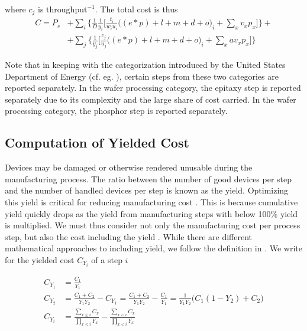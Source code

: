 \documentclass[10pt]{article}
\begin{document}
where $c_j$ is $\text{throughput}^{-1}$. The total cost is thus
\begin{equation}
\label{eqn:cost_total}
\begin{split}
    C= P_s &+ \sum_i \bigg \{ \frac{1}{D} \frac{1}{y_i} \bigg[ \frac{t_i}{w_i u_i} \bigg((e*p) + l + m + d +o \bigg)_i  + \sum_{x} v_x p_x \bigg] \bigg \} + \\
    & + \sum_j \bigg \{ \frac{1}{y_j} \bigg[ \frac{c_j}{u_j}  \bigg((e*p) + l + m + d + o \bigg)_i + \sum_{x} a v_x p_x \bigg ] \bigg\}
\end{split}
\end{equation}

Note that in keeping with the categorization introduced by the United States Department of Energy (cf. eg. \cite{doe_ssl_rnd_2019}), certain steps from these two categories are reported separately. In the wafer processing category, the epitaxy step is reported separately due to its complexity and the large share of cost carried. In the wafer processing category, the phosphor step is reported separately.

\subsection{Computation of Yielded Cost}

Devices may be damaged or otherwise rendered unusable during the manufacturing process. The ratio between the number of good devices per step and the number of handled devices per step is known as the yield. Optimizing this yield is critical for reducing manufacturing cost \cite{Kumar2006}. This is because cumulative yield quickly drops as the yield from manufacturing steps with below 100\% yield is multiplied. We must thus consider not only the manufacturing cost per process step, but also the cost including the yield \cite{becker2001use}\cite{becker2001using}. While there are different mathematical approaches to including yield, we follow the definition in \cite{becker2001use}. We write for the yielded cost $C_{Y_i}$ of a step $i$

\begin{equation}
\begin{split}
\label{eqn:C_2}
    C_{Y_1} &= \frac{C_1}{Y_1} \\
    C_{Y_2} &= \frac{C_1 + C_2}{Y_1 Y_2} - C_{Y_1} = \frac{C_1 + C_2}{Y_1 Y_2} - \frac{C_1}{Y_1} = \frac{1}{Y_1 Y_2} \bigg ( C_1 (1-Y_2) +C_2 \bigg)\\
    C_{Y_i} &= \frac{ \sum_{x \leq i} C_x }{ \prod_{x \leq i} Y_x } - \frac{ \sum_{x<i} C_x }{ \prod_{x<i} Y_x }
\end{split}
\end{equation}
\end{document}

